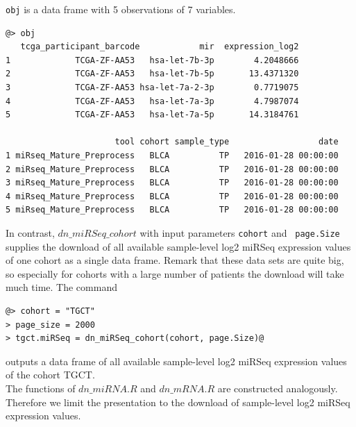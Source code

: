 \documentclass{TechReport}
\begin{document}
{\tt obj} is a data frame with 5 observations of 7 variables.
\begin{lstlisting}[style=base]
@> obj
   tcga_participant_barcode            mir  expression_log2
1             TCGA-ZF-AA53   hsa-let-7b-3p        4.2048666
2             TCGA-ZF-AA53   hsa-let-7b-5p       13.4371320
3             TCGA-ZF-AA53 hsa-let-7a-2-3p        0.7719075
4             TCGA-ZF-AA53   hsa-let-7a-3p        4.7987074
5             TCGA-ZF-AA53   hsa-let-7a-5p       14.3184761

                      tool cohort sample_type                  date         
1 miRseq_Mature_Preprocess   BLCA          TP   2016-01-28 00:00:00
2 miRseq_Mature_Preprocess   BLCA          TP   2016-01-28 00:00:00
3 miRseq_Mature_Preprocess   BLCA          TP   2016-01-28 00:00:00
4 miRseq_Mature_Preprocess   BLCA          TP   2016-01-28 00:00:00
5 miRseq_Mature_Preprocess   BLCA          TP   2016-01-28 00:00:00
\end{lstlisting}
In contrast, $dn\_miRSeq\_cohort$ with input parameters {\tt cohort} and {\tt
page.Size} supplies the download of all available sample-level log2 miRSeq
expression 
values of one cohort as a single data frame. 
Remark that these data sets are quite big, so especially for cohorts with a large
number of patients the download will take much time. The command
\begin{lstlisting}[style=base]
@> cohort = "TGCT"
> page_size = 2000
> tgct.miRSeq = dn_miRSeq_cohort(cohort, page.Size)@
\end{lstlisting}
outputs a data frame of all available sample-level log2 miRSeq expression values of
the cohort TGCT. \\
The functions of $dn\_miRNA.R$ and $dn\_mRNA.R$ are constructed analogously.
Therefore we limit the presentation to the download of sample-level 
log2 miRSeq expression values. 
\end{document}
